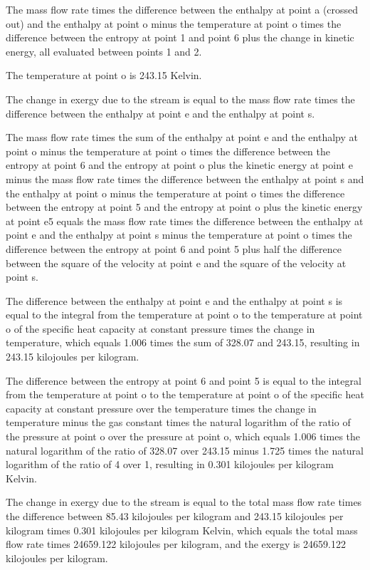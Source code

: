 The mass flow rate times the difference between the enthalpy at point a (crossed out) and the enthalpy at point o minus the temperature at point o times the difference between the entropy at point 1 and point 6 plus the change in kinetic energy, all evaluated between points 1 and 2.

The temperature at point o is 243.15 Kelvin.

The change in exergy due to the stream is equal to the mass flow rate times the difference between the enthalpy at point e and the enthalpy at point s.

The mass flow rate times the sum of the enthalpy at point e and the enthalpy at point o minus the temperature at point o times the difference between the entropy at point 6 and the entropy at point o plus the kinetic energy at point e minus the mass flow rate times the difference between the enthalpy at point s and the enthalpy at point o minus the temperature at point o times the difference between the entropy at point 5 and the entropy at point o plus the kinetic energy at point e5 equals the mass flow rate times the difference between the enthalpy at point e and the enthalpy at point s minus the temperature at point o times the difference between the entropy at point 6 and point 5 plus half the difference between the square of the velocity at point e and the square of the velocity at point s.

The difference between the enthalpy at point e and the enthalpy at point s is equal to the integral from the temperature at point o to the temperature at point o of the specific heat capacity at constant pressure times the change in temperature, which equals 1.006 times the sum of 328.07 and 243.15, resulting in 243.15 kilojoules per kilogram.

The difference between the entropy at point 6 and point 5 is equal to the integral from the temperature at point o to the temperature at point o of the specific heat capacity at constant pressure over the temperature times the change in temperature minus the gas constant times the natural logarithm of the ratio of the pressure at point o over the pressure at point o, which equals 1.006 times the natural logarithm of the ratio of 328.07 over 243.15 minus 1.725 times the natural logarithm of the ratio of 4 over 1, resulting in 0.301 kilojoules per kilogram Kelvin.

The change in exergy due to the stream is equal to the total mass flow rate times the difference between 85.43 kilojoules per kilogram and 243.15 kilojoules per kilogram times 0.301 kilojoules per kilogram Kelvin, which equals the total mass flow rate times 24659.122 kilojoules per kilogram, and the exergy is 24659.122 kilojoules per kilogram.